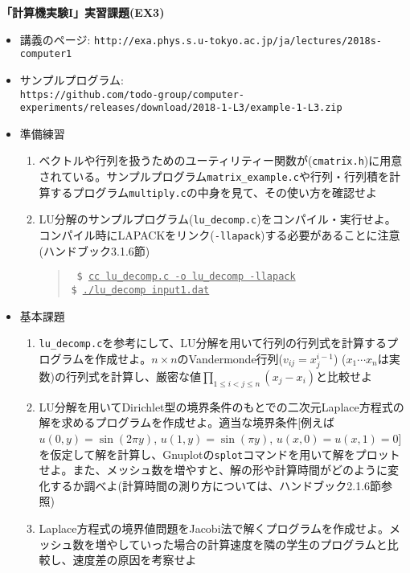 \documentclass[11pt]{jarticle}
\begin{document}
\noindent
{\bf\large 「計算機実験I」実習課題(EX3)}
\\[-0.5em]

\noindent
\begin{itemize}
\item 講義のページ: \verb+http://exa.phys.s.u-tokyo.ac.jp/ja/lectures/2018s-computer1+

\item サンプルプログラム: \\ {\small \verb+https://github.com/todo-group/computer-experiments/releases/download/2018-1-L3/example-1-L3.zip+}
  
\item 準備練習
  \begin{enumerate}
  \item ベクトルや行列を扱うためのユーティリティー関数が({\tt cmatrix.h})に用意されている。サンプルプログラム{\tt matrix\_example.c}や行列・行列積を計算するプログラム{\tt multiply.c}の中身を見て、その使い方を確認せよ
  \item LU分解のサンプルプログラム({\tt lu\_decomp.c})をコンパイル・実行せよ。コンパイル時にLAPACKをリンク({\tt -llapack})する必要があることに注意(ハンドブック3.1.6節)
    \begin{quote} \tt
      \$ \underline{cc lu\_decomp.c -o lu\_decomp -llapack} \\
      \$ \underline{./lu\_decomp input1.dat}
    \end{quote}
  \end{enumerate}

\item 基本課題
  \begin{enumerate}
  \item {\tt lu\_decomp.c}を参考にして、LU分解を用いて行列の行列式を計算するプログラムを作成せよ。$n \times n$のVandermonde行列($v_{ij}=x_j^{i-1}$) ($x_1 \cdots x_n$は実数)の行列式を計算し、厳密な値$\displaystyle \prod_{1 \le i < j \le n} (x_j-x_i)$と比較せよ
  \item LU分解を用いてDirichlet型の境界条件のもとでの二次元Laplace方程式の解を求めるプログラムを作成せよ。適当な境界条件[例えば$u(0,y) = \sin(2 \pi y)$, $u(1,y) = \sin(\pi y)$, $u(x,0)=u(x,1)=0$]を仮定して解を計算し、Gnuplotの{\tt splot}コマンドを用いて解をプロットせよ。また、メッシュ数を増やすと、解の形や計算時間がどのように変化するか調べよ(計算時間の測り方については、ハンドブック2.1.6節参照)
  \item Laplace方程式の境界値問題をJacobi法で解くプログラムを作成せよ。メッシュ数を増やしていった場合の計算速度を隣の学生のプログラムと比較し、速度差の原因を考察せよ
  \end{enumerate}
  

\end{itemize}
\end{document}
